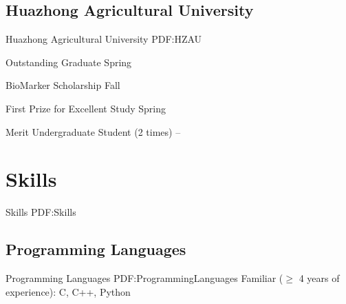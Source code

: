 \documentclass[letterpaper,10pt,oneside]{article}
\begin{document}
\begin{body}
\subsection
{Huazhong Agricultural University}
{Huazhong Agricultural University}
{PDF:HZAU}

\BulletItem
Outstanding Graduate
\hfill
Spring 

\GapNoBreak
\BulletItem
BioMarker Scholarship 
\hfill
Fall 

\GapNoBreak
\BulletItem
First Prize for Excellent Study 
\hfill
Spring 

\GapNoBreak
\BulletItem
Merit Undergraduate Student (2 times)
\hfill
{} --





\iffalse
\section
{Languages}
{Languages}
{PDF:Languages}

\BulletItem
English: Native language.

\GapNoBreak
\BulletItem
Spanish: Fluent (speaking, reading, writing).

\GapNoBreak
\BulletItem
Latin: Intermediate (reading); basic (speaking, writing).
\fi

\section
{Skills}
{Skills}
{PDF:Skills}


\subsection
{Programming Languages}
{Programming Languages}
{PDF:ProgrammingLanguages}
\GapNoBreak
\BulletItem
Familiar ($\geq$ 4 years of experience): C, C++, Python


\end{body}
\end{document}
